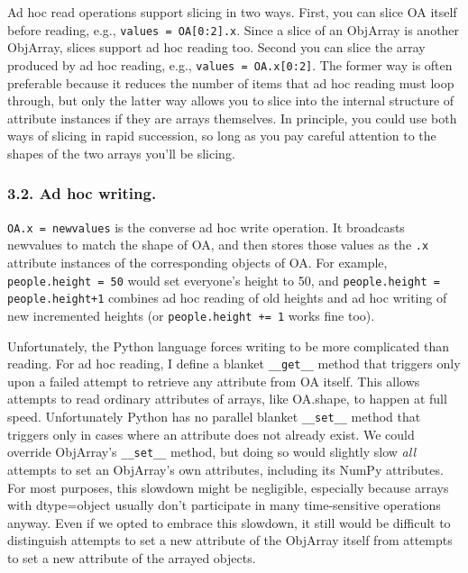 \documentclass[letterpaper,compsoc,twoside]{IEEEtran}
\begin{document}
Ad hoc read operations support slicing in two ways.  First, you can slice OA itself before reading, e.g., \texttt{values = OA{[}0:2{]}.x}.  Since a slice of an ObjArray is another ObjArray, slices support ad hoc reading too.   Second you can slice the array produced by ad hoc reading, e.g., \texttt{values = OA.x{[}0:2{]}}.  The former way is often preferable because it reduces the number of items that ad hoc reading must loop through, but only the latter way allows you to slice into the internal structure of attribute instances if they are arrays themselves.  In principle, you could use both ways of slicing in rapid succession, so long as you pay careful attention to the shapes of the two arrays you'll be slicing.

\subsubsection{3.2.  Ad hoc writing.%
  \label{ad-hoc-writing}%
}


\texttt{OA.x = newvalues} is the converse ad hoc write operation.  It broadcasts newvalues to match the shape of OA, and then stores those values as the \texttt{.x} attribute instances of the corresponding objects of OA.  For example, \texttt{people.height = 50} would set everyone's height to 50, and \texttt{people.height = people.height+1} combines ad hoc reading of old heights and ad hoc writing of new incremented heights (or \texttt{people.height += 1} works fine too).

Unfortunately, the Python language forces writing to be more complicated than reading.  For ad hoc reading, I define a blanket \texttt{\_\_get\_\_} method that triggers only upon a failed attempt to retrieve any attribute from OA itself.  This allows attempts to read ordinary attributes of arrays, like OA.shape, to happen at full speed.  Unfortunately Python has no parallel blanket \texttt{\_\_set\_\_} method that triggers only in cases where an attribute does not already exist.  We could override ObjArray's \texttt{\_\_set\_\_} method, but doing so would slightly slow \emph{all} attempts to set an ObjArray's own attributes, including its NumPy attributes.  For most purposes, this slowdown might be negligible, especially because arrays with dtype=object usually don't participate in many time-sensitive operations anyway.  Even if we opted to embrace this slowdown, it still would be difficult to distinguish attempts to set a new attribute of the ObjArray itself from attempts to set a new attribute of the arrayed objects.
\end{document}
